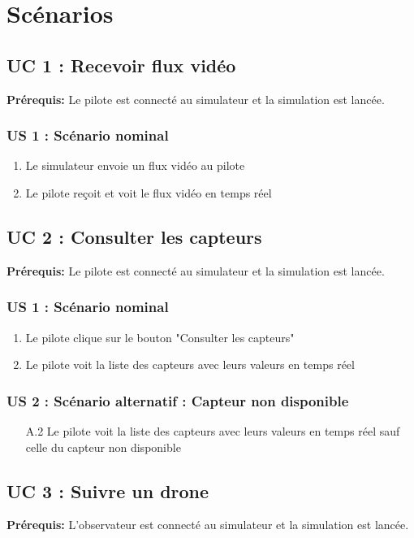 \documentclass{scrartcl}
\begin{document}
\section{Scénarios}

\subsection{UC 1 : Recevoir flux vidéo}
\textbf{Prérequis:} Le pilote est connecté au simulateur et la simulation est lancée.

\subsubsection*{US 1 : Scénario nominal}
\begin{enumerate}
    \item Le simulateur envoie un flux vidéo au pilote
    \item Le pilote reçoit et voit le flux vidéo en temps réel
\end{enumerate}

\subsection{UC 2 : Consulter les capteurs}
\textbf{Prérequis:} Le pilote est connecté au simulateur et la simulation est lancée.

\subsubsection*{US 1 : Scénario nominal}
\begin{enumerate}
    \item Le pilote clique sur le bouton "Consulter les capteurs"
    \item Le pilote voit la liste des capteurs avec leurs valeurs en temps réel
\end{enumerate}

\subsubsection*{US 2 : Scénario alternatif : Capteur non disponible}
\begin{enumerate}
    \item[A.2] Le pilote voit la liste des capteurs avec leurs valeurs en temps réel sauf celle du capteur non disponible
\end{enumerate}

\subsection{UC 3 : Suivre un drone}
\textbf{Prérequis:} L'observateur est connecté au simulateur et la simulation est lancée.
\end{document}
